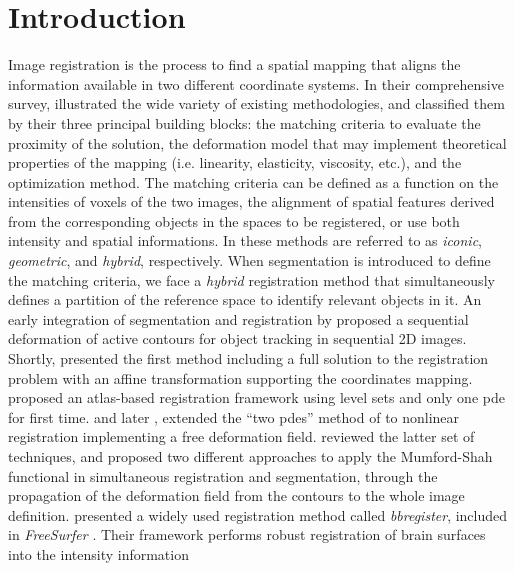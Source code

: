 \section{Introduction}%
\label{sec:introduction}
Image registration is the process to find a spatial mapping that aligns the information available
  in two different coordinate systems.
In their comprehensive survey, \cite{sotiras_deformable_2013} illustrated the wide variety
  of existing methodologies, and classified them by their three principal building blocks:
  the matching criteria to evaluate the proximity of the solution,
  the deformation model that may implement theoretical properties of the mapping
  (i.e. linearity, elasticity, viscosity, etc.), and the optimization method.
The matching criteria can be defined as a function on the intensities of voxels of the
  two images, the alignment of spatial features derived from the corresponding objects in
  the spaces to be registered, or use both intensity and spatial informations.
In \citep{sotiras_deformable_2013} these methods are referred to as \emph{iconic}, \emph{geometric},
  and \emph{hybrid}, respectively.
When segmentation is introduced to define the matching criteria, we face a \emph{hybrid}
  registration method that simultaneously defines a partition of the reference space to identify
  relevant objects in it.
An early integration of segmentation and registration by \cite{bertalmio_morphing_2000} proposed
  a sequential deformation of active contours for object tracking in sequential 2D images.
Shortly, \cite{yezzi_variational_2003} presented the first method including a full solution to
  the registration problem with an affine transformation supporting the coordinates mapping.
\cite{vemuri_joint_2003} proposed an atlas-based registration framework using level sets and only
  one \gls*{pde} for first time.
\cite{unal_coupled_2005} and later \cite{wang_joint_2006},
  extended the ``two \glspl*{pde}'' method of \cite{yezzi_variational_2003}
  to nonlinear registration implementing a free deformation field.
\cite{droske_mumfordshah_2009} reviewed the latter set of techniques, and proposed two different
  approaches to apply the Mumford-Shah functional \citep{mumford_optimal_1989} in simultaneous
  registration and segmentation, through the propagation of the deformation field from
  the contours to the whole image definition.
\cite{greve_accurate_2009} presented a widely used registration method called \emph{bbregister},
  included in \emph{FreeSurfer} \citep{fischl_freesurfer_2012}.
Their framework performs robust registration of brain surfaces into the intensity information
